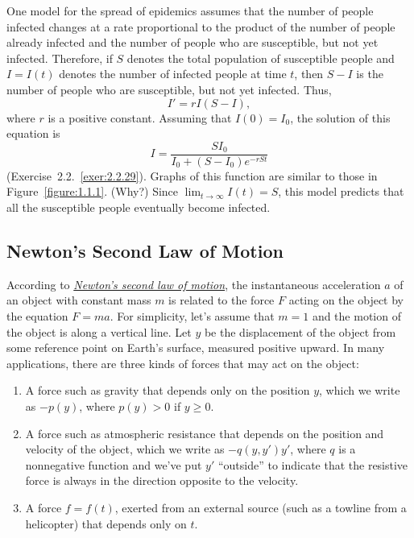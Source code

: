\documentclass{ximera}
\begin{document}
One model for the spread of epidemics assumes that the number of
people infected changes at a rate proportional to the product of the
number of people already infected and the number of people who are
susceptible, but not yet infected. Therefore, if $S$ denotes the
total population of susceptible people and $I=I(t)$ denotes the
number
of infected people at time $t$, then $S-I$ is the number of people
who are susceptible, but not yet infected. Thus,
$$
I'=rI(S-I),
$$
where $r$ is a positive constant. Assuming that $I(0)=I_0$,
the solution of this equation is
$$
I=\frac{SI_0}{I_0+(S-I_0)e^{-rSt}}
$$
(Exercise~2.2.~\hspace*{-3pt}\ref{exer:2.2.29}).
 Graphs of this function are similar to those in
Figure~\ref{figure:1.1.1}.
(Why?)
Since $\lim_{t\to\infty}I(t)=S$, this model predicts that all the
susceptible people eventually become infected.

\subsection*{Newton's Second Law of Motion}

According to
\href{http://www-history.mcs.st-and.ac.uk/Mathematicians/Newton.html}
{\color{blue}\it Newton's second law of motion},  the
instantaneous acceleration
$a$ of an object with constant mass $m$ is related to the force $F$
acting on the object by the equation $F=ma$. For simplicity, let's
assume that $m=1$ and the motion of the object is along a vertical
line. Let $y$ be the displacement of the object from some reference
point on Earth's surface, measured positive upward. In many
applications, there are three kinds of forces that may act on the
object:

\begin{enumerate}
\item %
A force such as gravity that depends only on the position $y$,
which we write as $-p(y)$, where $p(y)>0$ if $y\ge0$.

\item %
A force such as atmospheric resistance that depends on
the position and velocity of the object, which we write as
$-q(y,y')y'$, where $q$ is a nonnegative function and we've
put $y'$ ``outside'' to indicate that the resistive force is
always in the direction opposite to the velocity.
\item %
A force $f=f(t)$, exerted from an external source (such as a towline
from a helicopter) that depends only on $t$.
\end{enumerate}
\end{document}
